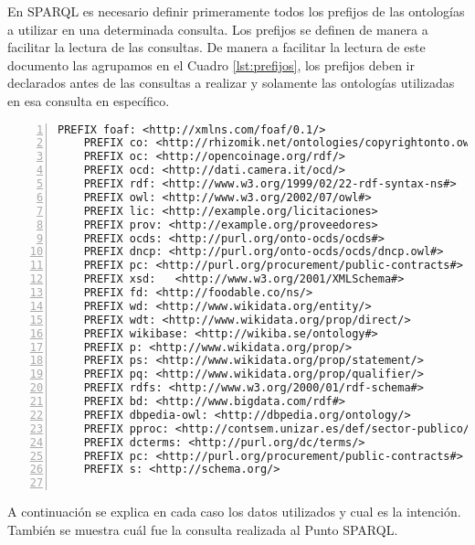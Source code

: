 En SPARQL es necesario definir primeramente todos los prefijos de las ontologías a utilizar en una determinada consulta. Los prefijos se definen de manera a facilitar la lectura de las consultas. De manera a facilitar la lectura de este documento las agrupamos en el Cuadro \ref{lst:prefijos}, los prefijos deben ir declarados antes de las consultas a realizar y solamente las ontologías utilizadas en esa consulta en específico.



\noindent\begin{minipage}[t]{\textwidth}
\begin{lstlisting}[captionpos=b, caption={Prefijos de las consultas SPARQL}, label={lst:prefijos},  numbers=left,  numberstyle=\tiny\color{mygray},frame=single]
    PREFIX foaf: <http://xmlns.com/foaf/0.1/>
    PREFIX co: <http://rhizomik.net/ontologies/copyrightonto.owl#>
    PREFIX oc: <http://opencoinage.org/rdf/>
    PREFIX ocd: <http://dati.camera.it/ocd/>
    PREFIX rdf: <http://www.w3.org/1999/02/22-rdf-syntax-ns#>
    PREFIX owl: <http://www.w3.org/2002/07/owl#>
    PREFIX lic: <http://example.org/licitaciones>
    PREFIX prov: <http://example.org/proveedores>
    PREFIX ocds: <http://purl.org/onto-ocds/ocds#>
    PREFIX dncp: <http://purl.org/onto-ocds/ocds/dncp.owl#>
    PREFIX pc: <http://purl.org/procurement/public-contracts#>
    PREFIX xsd:   <http://www.w3.org/2001/XMLSchema#>
    PREFIX fd: <http://foodable.co/ns/>
    PREFIX wd: <http://www.wikidata.org/entity/>
    PREFIX wdt: <http://www.wikidata.org/prop/direct/>
    PREFIX wikibase: <http://wikiba.se/ontology#>
    PREFIX p: <http://www.wikidata.org/prop/>
    PREFIX ps: <http://www.wikidata.org/prop/statement/>
    PREFIX pq: <http://www.wikidata.org/prop/qualifier/>
    PREFIX rdfs: <http://www.w3.org/2000/01/rdf-schema#>
    PREFIX bd: <http://www.bigdata.com/rdf#>
    PREFIX dbpedia-owl: <http://dbpedia.org/ontology/>
    PREFIX pproc: <http://contsem.unizar.es/def/sector-publico/pproc#> 
    PREFIX dcterms: <http://purl.org/dc/terms/> 
    PREFIX pc: <http://purl.org/procurement/public-contracts#> 
    PREFIX s: <http://schema.org/> 
    
 \end{lstlisting}
\end{minipage}

 A continuación se explica en cada caso los datos utilizados y cual es la intención. También se muestra cuál fue la consulta realizada al Punto SPARQL.








